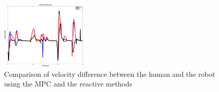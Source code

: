 \documentclass[letterpaper, 10 pt, conference]{ieeeconf}
\begin{document}
	\begin{figure}
		\centering
		\includegraphics[width=0.37\textwidth]{figures/vel_diff.pdf}
		\caption{Comparison of velocity difference between the human and the robot using the MPC and the reactive methods}
		\label{fig:err_v}
	\end{figure}
	
%	
	
\end{document}
